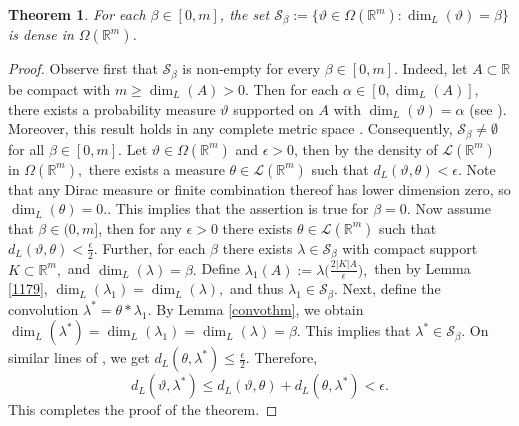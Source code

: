 \documentclass{amsproc}
\newtheorem{theorem}{Theorem}[section]
\theoremstyle{definition}
\theoremstyle{remark}
\numberwithin{equation}{section}
\begin{document}
  




\begin{theorem}\label{densethm112}
    For each $\beta \in [0,m]$, the set $\mathcal{S}_\beta:=\{\vartheta\in\Omega(\mathbb{R}^m): \dim_{L}(\vartheta)= \beta\}$ is dense in $\Omega(\mathbb{R}^m)$.
\end{theorem}
\begin{proof}
 Observe first that \(\mathcal{S}_{\beta}\) is non‑empty for every \(\beta\in[0,m]\). Indeed, let \(A\subset\mathbb{R}\) be compact with \(m\ge \dim_L(A)>0\). Then for each \(\alpha\in[0,\dim_L(A)]\), there exists a probability measure \(\vartheta\) supported on \(A\) with \(\dim_L(\vartheta)=\alpha\) (see \cite[Theorem 4.1]{Hare}). Moreover, this result holds in any complete metric space \cite{Suom}. Consequently, \(\mathcal{S}_{\beta}\neq\emptyset\) for all \(\beta\in[0,m]\). Let $\vartheta \in \Omega({\mathbb{R}^m})$ and $\epsilon>0$, then by the density of $\mathcal{L}({\mathbb{R}}^m)$ in $\Omega({\mathbb{R}^m}),$ there exists a measure $\theta \in \mathcal{L}({\mathbb{R}}^m)$ such that $d_L(\vartheta,\theta)< \epsilon.$ Note that any Dirac measure or finite combination thereof has lower dimension zero, so $\dim_L(\theta)=0.$. This implies that the assertion is true for $\beta=0.$ Now assume that $\beta \in (0,m]$, then for any $\epsilon >0$ there exists $\theta \in \mathcal{L}(\mathbb{R}^m)$ such that $d_L(\vartheta,\theta)< \frac{\epsilon}{2}.$ Further, for each $\beta$ there exists $\lambda \in \mathcal{S}_{\beta}$ with compact support $K \subset \mathbb{R}^m,$ and $\dim_L(\lambda)= \beta.$ Define $\lambda_1 (A) := \lambda \big( \frac{2|K| A}{\epsilon}\big),$ then by Lemma \ref{1179}, $\dim_L(\lambda_1)= \dim_L(\lambda),$ and thus $\lambda_1 \in \mathcal{S}_{\beta}.$ Next, define the convolution $\lambda^*= \theta * \lambda_1.$ By Lemma \ref{convothm}, we obtain $\dim_L(\lambda^*)= \dim_L(\lambda_1)= \dim_L(\lambda)= \beta.$ This implies that $\lambda^* \in \mathcal{S}_{\beta}.$ On similar lines of \cite[Theorem 3.19]{VAM}, we get $d_L(\theta, \lambda^*)\le \frac{\epsilon}{2}.$ Therefore,
 $$d_L(\vartheta,\lambda^*) \le d_L(\vartheta,\theta)+ d_L(\theta, \lambda^*) < \epsilon.$$ This completes the proof of the theorem.
\end{proof}
\end{document}

